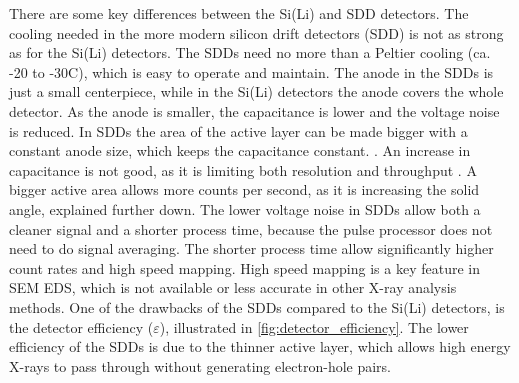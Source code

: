 There are some key differences between the Si(Li) and SDD detectors. %
The cooling needed in the more modern silicon drift detectors (SDD) is not as strong as for the Si(Li) detectors. %
The SDDs need no more than a Peltier cooling (ca. -20 to -30\textdegree C), which is easy to operate and maintain.
The anode in the SDDs is just a small centerpiece, while in the Si(Li) detectors the anode covers the whole detector.
As the anode is smaller, the capacitance is lower and the voltage noise is reduced.
In SDDs the area of the active layer can be made bigger with a constant anode size, which keeps the capacitance constant. \cite{notaros_electromagnetics_2010}.
An increase in capacitance is not good, as it is limiting both resolution and throughput \cite[Ch. 16.3.9]{goldstein_scanning_2018}.
A bigger active area allows more counts per second, as it is increasing the solid angle, explained further down.
The lower voltage noise in SDDs allow both a cleaner signal and a shorter process time, because the pulse processor does not need to do signal averaging.
The shorter process time allow significantly higher count rates and high speed mapping.
High speed mapping is a key feature in SEM EDS, which is not available or less accurate in other X-ray analysis methods.
One of the drawbacks of the SDDs compared to the Si(Li) detectors, is the detector efficiency ($\varepsilon$), illustrated in \cref{fig:detector_efficiency}.
The lower efficiency of the SDDs is due to the thinner active layer, which allows high energy X-rays to pass through without generating electron-hole pairs.


